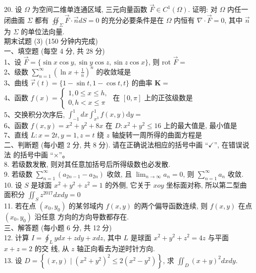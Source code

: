 \documentclass[a4paper,11pt,UTF8]{article}
\begin{document}
20. 设 $\Omega$ 为空间二维单连通区域, 三元向量函数 $\vec{F} \in C^1(\Omega)$. 证明: 对 $\Omega$ 内任一闭曲面 $\Sigma$ 都有 $\displaystyle \oiint_{\Sigma} \vec{F} \cdot \vec{n} d S=0$ 的充分必要条件是在 $\Omega$ 内恒有 $\nabla \cdot \vec{F}=0$, 其中 $\vec{n}$ 为 $\Sigma$ 的单位法向量.\\
\newpage
期末试题 (3) (150 分钟内完成)\\
一、填空题 (每空 4 分, 共 28 分)\\
1、设 $\vec{F}=\{\sin x \cos y, \sin y \cos z, \sin z \cos x\}$, 则 rot $\vec{F}=$\\
2、级数 $\displaystyle \sum_{n=1}^{\infty}\left(\ln x+\frac{1}{n}\right)^n$ 的收敛域是\\
3、曲线 $\vec{r}(t)=\{1-\sin t, 1-\cos t, t\}$ 的曲率 $\boldsymbol{K}=$\\
4、函数 $f(x)=\left\{\begin{array}{l}1,0 \leq x \leq h, \\ 0, h<x \leq \pi\end{array}\right.$ 在 $[0, \pi]$ 上的正弦级数是\\
5、交换积分次序后, $\displaystyle \int_{-1}^1 d x \int_{x^3}^1 f(x, y) \mathrm{d} y=$\\
6、函数 $f(x, y)=x^2+y^2+8 x$ 在 $D: x^2+y^2 \leq 16$ 上的最大值是,
最小值是\\
7、直线 $L: x=2 t, y=1, z=t$ 绕 $z$ 轴旋转一周所得的曲面方程是\\
二、判断题 (每小题 2 分, 共 8 分). 请在正确说法相应的括号中画 “$\checkmark$”, 在错误说法 的括号中画 “×”。\\
8. 若级数发散, 则对其任意加括号后所得级数也必发散.\\
9. 若级数 $\displaystyle \sum_{n=1}^{\infty}\left(a_{2 n-1}-a_{2 n}\right)$ 收敛, 且 $\displaystyle \lim _{n \rightarrow \infty} a_n=0$, 则 $\displaystyle \sum_{n=1}^{\infty} a_n$ 收敛.\\
10. 设 $S$ 是球面 $x^2+y^2+z^2=1$ 的外侧, 它关于 $x o y$ 坐标面对称, 所以第二型曲面积分 $\displaystyle \iint_S z^{2017} d x d y=0$\\
11. 若在点 $\left(x_0, y_0\right)$ 的某邻域内 $f(x, y)$ 的两个偏导函数连续, 则 $f(x, y)$ 在点 $\left(x_0, y_0\right)$ 沿任意 方向的方向导数都存在.\\
三、解答题 (每小题 6 分, 共 12 分)\\
12. 计算 $\displaystyle I=\oint_L y d x+z d y+x d z$, 其中 $L$ 是球面 $x^2+y^2+z^2=4 z$ 与平面 $x+z=2$ 的交 线, 从 $z$ 轴正向看去为逆时针方向.\\
13. 设 $D=\left\{(x, y) \mid\left(x^2+y^2\right)^2 \leq 2\left(x^2-y^2\right)\right\}$, 求 $\displaystyle \iint_D(x+y)^2 d x d y$.\\
\end{document}
